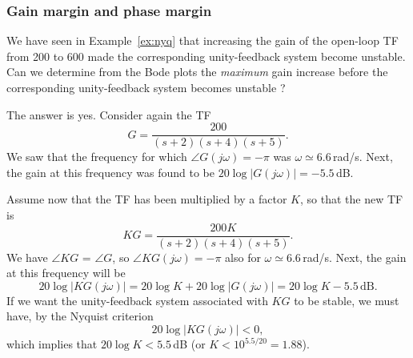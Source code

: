 \documentclass[a4paper,11pt]{report}
\theoremstyle{definition}
\begin{document}




\subsubsection{Gain margin and phase margin}

We have seen in Example~\ref{ex:nyq} that increasing the gain of the
open-loop TF from 200 to 600 made the corresponding unity-feedback
system become unstable. Can we determine from the Bode plots the
\emph{maximum} gain increase before the corresponding unity-feedback
system becomes unstable ?

The answer is yes. Consider again the TF
\[
G=\frac{200}{(s+2)(s+4)(s+5)}.
\]
We saw that the frequency for which $\angle G(j\omega) = -\pi$ was
$\omega\simeq 6.6$\,rad/s. Next, the gain at this frequency was found
to be $20\log|G(j\omega)|=-5.5$\,dB.

Assume now that the TF has been multiplied by a factor $K$, so that
the new TF is
\[
KG = \frac{200K}{(s+2)(s+4)(s+5)}.
\]
We have $\angle KG$ = $\angle G$, so $\angle KG(j\omega) = -\pi$ also for
$\omega\simeq 6.6$\,rad/s. Next, the gain at this frequency will be
\[
20\log|KG(j\omega)| = 20\log K + 20\log|G(j\omega)|= 20\log K -5.5\,\mathrm{dB}.
\]
If we want the unity-feedback system associated with $KG$
to be stable, we must have, by the Nyquist criterion
\[
20\log|KG(j\omega)| < 0,
\]
which implies that $20\log K<5.5$\,dB (or $K< 10^{5.5/20}=1.88$).
\end{document}
